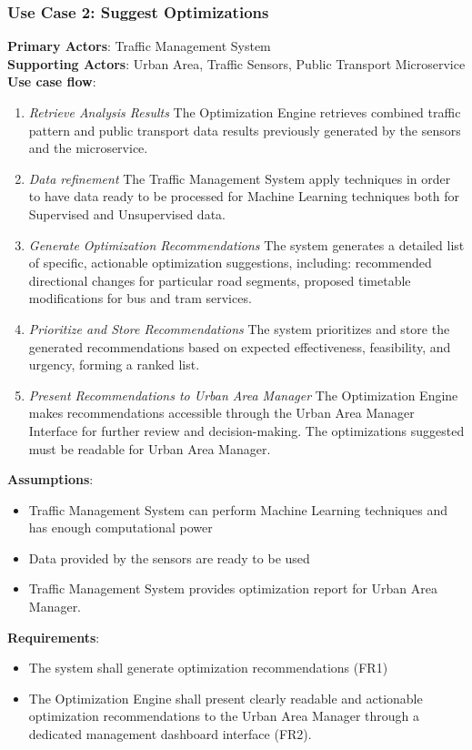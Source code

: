 \documentclass[a4paper,12pt]{article}
\begin{document}
\subsubsection*{Use Case 2: Suggest Optimizations}
\textbf{Primary Actors}: Traffic Management System \\
\textbf{Supporting Actors}:  Urban Area, Traffic Sensors, Public Transport Microservice \\
\textbf{Use case flow}: 
\begin{enumerate}
    \item \textit{Retrieve Analysis Results}
    The Optimization Engine retrieves combined traffic pattern and public transport data results previously generated by the sensors and the microservice.
    \item \textit{Data refinement} The Traffic Management System apply techniques in order to have data ready to be processed for Machine Learning techniques both for Supervised and Unsupervised data.
    \item \textit{Generate Optimization Recommendations} The system generates a detailed list of specific, actionable optimization suggestions, including: recommended directional changes for particular road segments, proposed timetable modifications for bus and tram services.
    \item \textit{Prioritize and Store Recommendations} The system prioritizes and store the generated recommendations based on expected effectiveness, feasibility, and urgency, forming a ranked list.
    \item \textit{Present Recommendations to Urban Area Manager} The Optimization Engine makes recommendations accessible through the Urban Area Manager Interface for further review and decision-making. The optimizations suggested must be readable for Urban Area Manager.
\end{enumerate}
\textbf{Assumptions}: 
\begin{itemize}
    \item Traffic Management System can perform Machine Learning techniques and has enough computational power
    \item Data provided by the sensors are ready to be used
    \item Traffic Management System provides optimization report for Urban Area Manager.
\end{itemize}
\textbf{Requirements}: 
\begin{itemize}
    \item The system shall generate optimization recommendations (FR1)
    \item The Optimization Engine shall present clearly readable and actionable optimization recommendations to the Urban Area Manager through a dedicated management dashboard interface (FR2).
\end{itemize}
\end{document}
